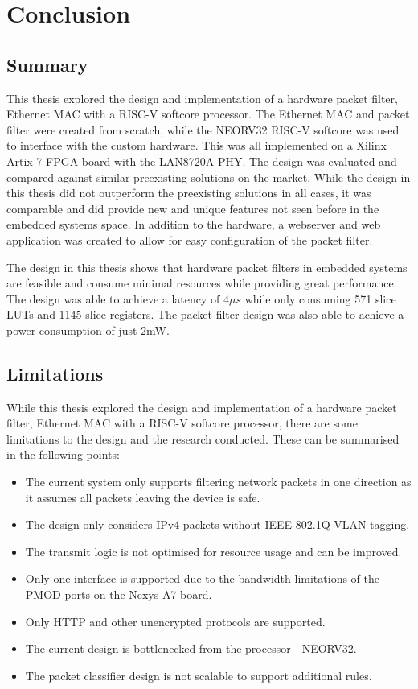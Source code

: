 \chapter[Conclusion]{Conclusion}
\label{Chap:Conclusion}

\section{Summary}

This thesis explored the design and implementation of a hardware packet filter, Ethernet MAC with a RISC-V softcore processor. The Ethernet MAC and packet filter were created from scratch, while the NEORV32 RISC-V softcore was used to interface with the custom hardware. This was all implemented on a Xilinx Artix 7 FPGA board with the LAN8720A PHY. The design was evaluated and compared against similar preexisting solutions on the market. While the design in this thesis did not outperform the preexisting solutions in all cases, it was comparable and did provide new and unique features not seen before in the embedded systems space. In addition to the hardware, a webserver and web application was created to allow for easy configuration of the packet filter. 

The design in this thesis shows that hardware packet filters in embedded systems are feasible and consume minimal resources while providing great performance. The design was able to achieve a latency of $4\mu s$ while only consuming 571 slice LUTs and 1145 slice registers. The packet filter design was also able to achieve a power consumption of just 2mW.



\section{Limitations}
While this thesis explored the design and implementation of a hardware packet filter, Ethernet MAC with a RISC-V softcore processor, there are some limitations to the design and the research conducted. These can be summarised in the following points:


\begin{itemize}
    \item The current system only supports filtering network packets in one direction as it assumes all packets leaving the device is safe. 
    \item The design only considers IPv4 packets without IEEE 802.1Q VLAN tagging.
    \item The transmit logic is not optimised for resource usage and can be improved.
    \item Only one interface is supported due to the bandwidth limitations of the PMOD ports on the Nexys A7 board.
    \item Only HTTP and other unencrypted protocols are supported.
    \item The current design is bottlenecked from the processor - NEORV32.
    \item The packet classifier design is not scalable to support additional rules.
\end{itemize}


